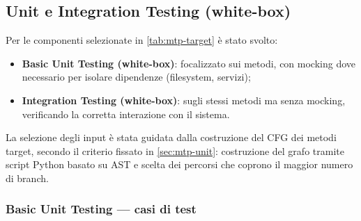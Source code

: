 \documentclass[11pt,a4paper]{article}
\begin{document}
\subsection{Unit e Integration Testing (white-box)}
\label{sec:whitebox}

Per le componenti selezionate in \cref{tab:mtp-target} \`e stato svolto:

\begin{itemize}[nosep]
  \item \textbf{Basic Unit Testing (white-box)}: focalizzato sui metodi, con
    mocking dove necessario per isolare dipendenze (filesystem, servizi);
  \item \textbf{Integration Testing (white-box)}: sugli stessi metodi ma senza
    mocking, verificando la corretta interazione con il sistema.
\end{itemize}

La selezione degli input \`e stata guidata dalla costruzione del CFG dei metodi
target, secondo il criterio fissato in \cref{sec:mtp-unit}: costruzione del
grafo tramite script Python basato su AST e scelta dei percorsi che coprono il
maggior numero di branch.

\subsubsection{Basic Unit Testing --- casi di test}
\label{sec:ut}
\end{document}
